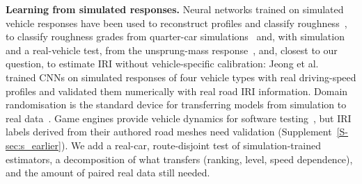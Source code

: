 \textbf{Learning from simulated responses.}
Neural networks trained on simulated vehicle responses have been used to reconstruct profiles and classify roughness~\cite{ngwangwa2010ann}, to classify roughness grades from quarter-car simulations~\cite{rcnn2023sim} and, with simulation and a real-vehicle test, from the unsprung-mass response~\cite{speedadaptive2025}, and, closest to our question, to estimate IRI without vehicle-specific calibration: Jeong et al.~\cite{jeong2020cnn} trained CNNs on simulated responses of four vehicle types with real driving-speed profiles and validated them numerically with real road IRI information.
Domain randomisation is the standard device for transferring models from simulation to real data~\cite{tobin2017dr}.
Game engines provide vehicle dynamics for software testing~\cite{gambi2019beamng,beamng}, but IRI labels derived from their authored road meshes need validation (Supplement~\ref{S-sec:s_earlier}).
We add a real-car, route-disjoint test of simulation-trained estimators, a decomposition of what transfers (ranking, level, speed dependence), and the amount of paired real data still needed.
